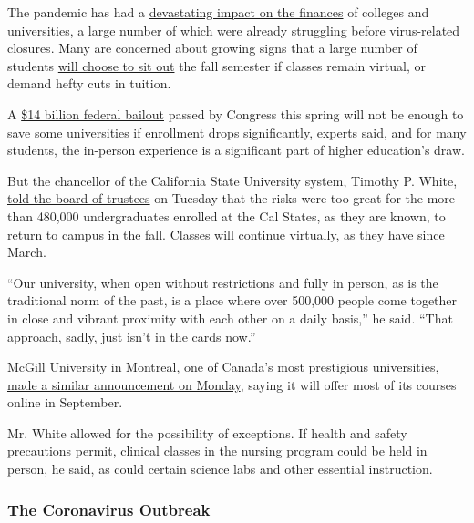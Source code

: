 The pandemic has had a
\href{https://www.nytimes.com/2020/04/15/us/coronavirus-colleges-universities-admissions.html}{devastating
impact on the finances} of colleges and universities, a large number of
which were already struggling before virus-related closures. Many are
concerned about growing signs that a large number of students
\href{https://www.nytimes.com/2020/05/01/us/coronavirus-college-enrollment.html}{will
choose to sit out} the fall semester if classes remain virtual, or
demand hefty cuts in tuition.

A
\href{https://www.nytimes.com/2020/03/25/us/politics/colleges-universities-coronavirus.html}{\$14
billion federal bailout} passed by Congress this spring will not be
enough to save some universities if enrollment drops significantly,
experts said, and for many students, the in-person experience is a
significant part of higher education's draw.

But the chancellor of the California State University system, Timothy P.
White,
\href{https://www2.calstate.edu/csu-system/board-of-trustees/livestream/Pages/livestream.aspx}{told
the board of trustees} on Tuesday that the risks were too great for the
more than 480,000 undergraduates enrolled at the Cal States, as they are
known, to return to campus in the fall. Classes will continue virtually,
as they have since March.

``Our university, when open without restrictions and fully in person, as
is the traditional norm of the past, is a place where over 500,000
people come together in close and vibrant proximity with each other on a
daily basis,'' he said. ``That approach, sadly, just isn't in the cards
now.''

McGill University in Montreal, one of Canada's most prestigious
universities,
\href{https://www.nytimes.com/2020/05/11/world/coronavirus-news.html\#link-1cc52594}{made
a similar announcement on Monday}, saying it will offer most of its
courses online in September.

Mr. White allowed for the possibility of exceptions. If health and
safety precautions permit, clinical classes in the nursing program could
be held in person, he said, as could certain science labs and other
essential instruction.

\hypertarget{the-coronavirus-outbreak}{%
\subsubsection{The Coronavirus
Outbreak}\label{the-coronavirus-outbreak}}

